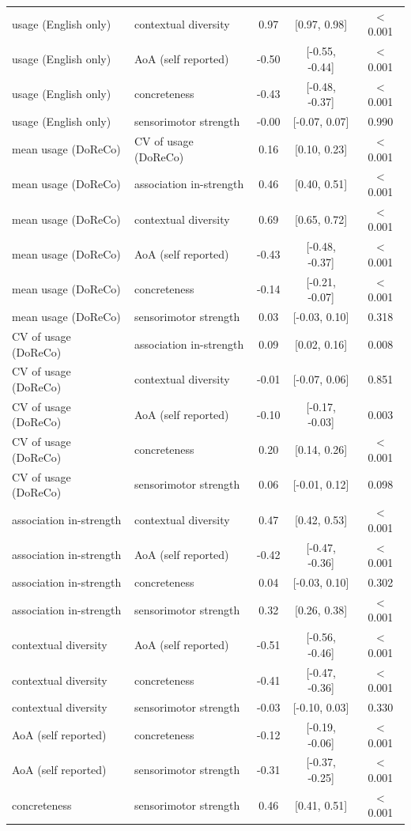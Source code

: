 \begin{tabular}{llccc}
  usage (English only) & contextual diversity & 0.97 & [0.97, 0.98] & < 0.001 \\ 
  usage (English only) & AoA (self reported) & -0.50 & [-0.55, -0.44] & < 0.001 \\ 
  usage (English only) & concreteness & -0.43 & [-0.48, -0.37] & < 0.001 \\ 
  usage (English only) & sensorimotor strength & -0.00 & [-0.07, 0.07] & 0.990 \\ 
  mean usage (DoReCo) & CV of usage (DoReCo) & 0.16 & [0.10, 0.23] & < 0.001 \\ 
  mean usage (DoReCo) & association in-strength & 0.46 & [0.40, 0.51] & < 0.001 \\ 
  mean usage (DoReCo) & contextual diversity & 0.69 & [0.65, 0.72] & < 0.001 \\ 
  mean usage (DoReCo) & AoA (self reported) & -0.43 & [-0.48, -0.37] & < 0.001 \\ 
  mean usage (DoReCo) & concreteness & -0.14 & [-0.21, -0.07] & < 0.001 \\ 
  mean usage (DoReCo) & sensorimotor strength & 0.03 & [-0.03, 0.10] & 0.318 \\ 
  CV of usage (DoReCo) & association in-strength & 0.09 & [0.02, 0.16] & 0.008 \\ 
  CV of usage (DoReCo) & contextual diversity & -0.01 & [-0.07, 0.06] & 0.851 \\ 
  CV of usage (DoReCo) & AoA (self reported) & -0.10 & [-0.17, -0.03] & 0.003 \\ 
  CV of usage (DoReCo) & concreteness & 0.20 & [0.14, 0.26] & < 0.001 \\ 
  CV of usage (DoReCo) & sensorimotor strength & 0.06 & [-0.01, 0.12] & 0.098 \\ 
  association in-strength & contextual diversity & 0.47 & [0.42, 0.53] & < 0.001 \\ 
  association in-strength & AoA (self reported) & -0.42 & [-0.47, -0.36] & < 0.001 \\ 
  association in-strength & concreteness & 0.04 & [-0.03, 0.10] & 0.302 \\ 
  association in-strength & sensorimotor strength & 0.32 & [0.26, 0.38] & < 0.001 \\ 
  contextual diversity & AoA (self reported) & -0.51 & [-0.56, -0.46] & < 0.001 \\ 
  contextual diversity & concreteness & -0.41 & [-0.47, -0.36] & < 0.001 \\ 
  contextual diversity & sensorimotor strength & -0.03 & [-0.10, 0.03] & 0.330 \\ 
  AoA (self reported) & concreteness & -0.12 & [-0.19, -0.06] & < 0.001 \\ 
  AoA (self reported) & sensorimotor strength & -0.31 & [-0.37, -0.25] & < 0.001 \\ 
  concreteness & sensorimotor strength & 0.46 & [0.41, 0.51] & < 0.001 \\ 
   \hline
\end{tabular}
